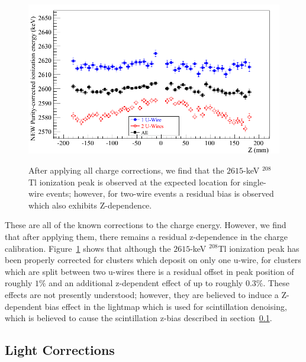 \begin{figure}
\begin{center}
\includegraphics[keepaspectratio=true,width=\textwidth]{ResidualChargeZBias.png}
\end{center}
\renewcommand{\baselinestretch}{1}
\small\normalsize
\begin{quote}
\caption{After applying all charge corrections, we find that the $2615$-keV $^{208}$Tl ionization peak is observed at the expected location for single-wire events; however, for two-wire events a residual bias is observed which also exhibits Z-dependence.~\cite{EnergyDocumentRun2ab}}
\label{fig:ResidualChargeZBias}
\end{quote}
\end{figure}
\renewcommand{\baselinestretch}{2}
\small\normalsize

These are all of the known corrections to the charge energy.  However, we find that after applying them, there remains a residual z-dependence in the charge calibration.  Figure~\ref{fig:ResidualChargeZBias} shows that although the $2615$-keV $^{208}$Tl ionization peak has been properly corrected for clusters which deposit on only one u-wire, for clusters which are split between two u-wires there is a residual offset in peak position of roughly $1\%$ and an additional z-dependent effect of up to roughly $0.3\%$.  These effects are not presently understood; however, they are believed to induce a Z-dependent bias effect in the lightmap which is used for scintillation denoising, which is believed to cause the scintillation z-bias described in section~\ref{sec:ResultEnergyLight}.~\cite{EnergyDocumentRun2ab}

\subsection{Light Corrections}\label{sec:ResultEnergyLight}

